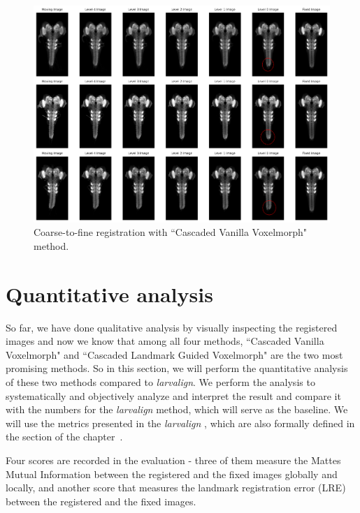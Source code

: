 \documentclass{book}
\begin{document}
	\begin{figure}[h!]
		\centering
		\includegraphics[width=\columnwidth]{resources/chapter4/method4/vanilla/registered_images.png}
		\caption{Coarse-to-fine registration with ``Cascaded Vanilla Voxelmorph" method.}
		\label{fig:method3_combine}
	\end{figure}

	\section{Quantitative analysis} \label{sec:Quantitative}
	So far, we have done qualitative analysis by visually inspecting the registered images and now we know that among all four methods, ``Cascaded Vanilla Voxelmorph" and ``Cascaded Landmark Guided Voxelmorph" are the two most promising methods. So in this section, we will perform the quantitative analysis of these two methods compared to \emph{larvalign}. We perform the analysis to systematically and objectively analyze and interpret the result and compare it with the numbers for the \textit{larvalign} method, which will serve as the baseline. We will use the metrics presented in the \textit{larvalign} \cite{larvalign}, which are also formally defined in the  section of the chapter~.
	
	Four scores are recorded in the evaluation - three of them measure the Mattes Mutual Information between the registered and the fixed images globally and locally, and another score that measures the landmark registration error (LRE) between the registered and the fixed images. 
	
\end{document}
